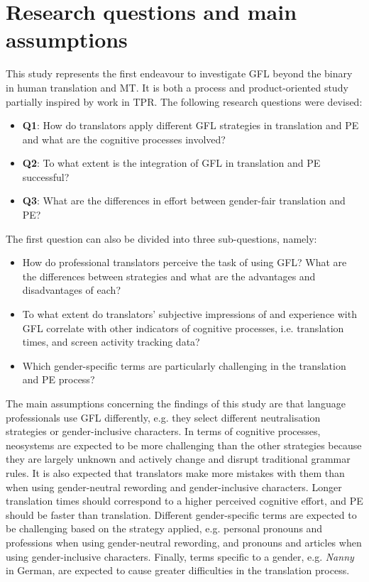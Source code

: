 \section{Research questions and main assumptions}
This study represents the first endeavour to investigate GFL beyond the binary in human translation and MT. It is both a process and product-oriented study partially inspired by work in TPR. The following research questions were devised:
\begin{itemize}
\setlength\itemsep{-0.5em}
    \item \textbf{Q1}: How do translators apply different GFL strategies in translation and PE and what are the cognitive processes involved?
    \item \textbf{Q2}: To what extent is the integration of GFL in translation and PE successful?
    \item \textbf{Q3}: What are the differences in effort between gender-fair translation and PE?
\end{itemize}
The first question can also be divided into three sub-questions, namely:
\begin{itemize}
\setlength\itemsep{-0.5em}
    \item How do professional translators perceive the task of using GFL? What are the differences between strategies and what are the advantages and disadvantages of each?
    \item To what extent do translators’ subjective impressions of and experience with GFL correlate with other indicators of cognitive processes, i.e. translation times, and screen activity tracking data?
    \item Which gender-specific terms are particularly challenging in the translation and PE process?
\end{itemize}

The main assumptions concerning the findings of this study are that language professionals use GFL differently, e.g. they select different neutralisation strategies or gender-inclusive characters. In terms of cognitive processes, neosystems are expected to be more challenging than the other strategies because they are largely unknown and actively change and disrupt traditional grammar rules. It is also expected that translators make more mistakes with them than when using gender-neutral rewording and gender-inclusive characters. Longer translation times should correspond to a higher perceived cognitive effort, and PE should be faster than translation. Different gender-specific terms are expected to be challenging based on the strategy applied, e.g. personal pronouns and professions when using gender-neutral rewording, and pronouns and articles when using gender-inclusive characters. Finally, terms specific to a gender, e.g. \textit{Nanny} in German, are expected to cause greater difficulties in the translation process.

